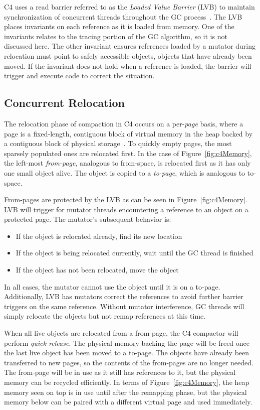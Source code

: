 \documentclass{sig-alternate}
\begin{document}
C4 uses a read barrier referred to as the \emph{Loaded Value Barrier} (LVB) to 
maintain synchronization of concurrent threads throughout the GC process~\cite{Tene:C4}. The LVB 
places invariants on each reference as it is loaded from memory.
One of the invariants relates to the tracing portion of the GC algorithm, so
it is not discussed here. The other invariant ensures
references loaded by a mutator during relocation must point to safely
accessible objects, objects that have already been moved.
If the invariant does not hold
when a reference is loaded, the barrier will trigger and execute code to correct
the situation.


\subsection{Concurrent Relocation}
\label{sec:c4Relocation}

The relocation phase of compaction in C4 occurs on a per-\emph{page}
basis, where a page is a fixed-length, contiguous block of virtual memory in the heap
backed by a contiguous block of physical storage~\cite{Tene:C4}.
To quickly empty pages, the most sparsely populated ones are relocated
first. In the case of Figure~\ref{fig:c4Memory}, the left-most 
\emph{from-page}, analogous to from-space, is relocated first as it has only one small object alive.
The object is copied to a \emph{to-page}, which is analogous to to-space.

From-pages are protected by the LVB as can be seen in Figure~\ref{fig:c4Memory}. 
LVB will trigger for mutator threads encountering a reference to an object
on a protected page. The mutator's subsequent behavior is:
\begin{itemize}
\item If the object is relocated already, find its new location
\item If the object is being relocated currently, wait until the GC thread is finished
\item If the object has not been relocated, move the object 
\end{itemize}
In all cases, the mutator cannot use the object until it is on a to-page.
Additionally, LVB has mutators correct the
references to avoid further barrier triggers on the same
reference.
Without mutator interference, GC threads will simply relocate the objects but
not remap references at this time. 

When all live objects are relocated from a from-page,
the C4 compactor will perform \emph{quick release}. 
The physical memory backing the page will be freed
once the last live object has been moved to a to-page. The objects have already 
been transferred to new pages, so the contents of the from-pages are no longer needed. The from-page 
will be in use as it still has references to it, but the physical memory can be recycled efficiently. 
In terms of Figure~\ref{fig:c4Memory}, the heap
memory seen on top is in use until after the remapping phase, but the physical memory below 
can be paired with a different virtual page and used immediately.
\end{document}
